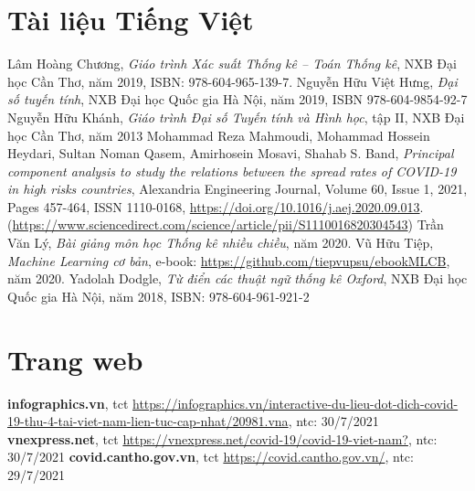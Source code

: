 \documentclass[./thesis.tex]{subfiles}
\begin{document}
	\begin{thebibliography}{10}
  
  
  	\section*{Tài liệu Tiếng Việt}
		   Lâm Hoàng Chương, \textit{Giáo trình Xác suất Thống kê -- Toán Thống kê}, NXB Đại học Cần Thơ, năm 2019, ISBN: 978-604-965-139-7.
		 Nguyễn Hữu Việt Hưng, \textit{Đại số tuyến tính}, NXB Đại học Quốc gia Hà Nội, năm 2019, ISBN 978-604-9854-92-7
		 Nguyễn Hữu Khánh, \textit{Giáo trình Đại số Tuyến tính và Hình học}, tập II, NXB Đại học Cần Thơ, năm 2013
		 Mohammad Reza Mahmoudi, Mohammad Hossein Heydari, Sultan Noman Qasem, Amirhosein Mosavi, Shahab S. Band, \textit{Principal component analysis to study the relations between the spread rates of COVID-19 in high risks countries}, Alexandria Engineering Journal, Volume 60, Issue 1, 2021, Pages 457-464, ISSN 1110-0168, \url{https://doi.org/10.1016/j.aej.2020.09.013}. (\url{https://www.sciencedirect.com/science/article/pii/S1110016820304543})
		 Trần Văn Lý, \textit{Bài giảng môn học Thống kê nhiều chiều}, năm 2020.
		 Vũ Hữu Tiệp, \textit{Machine Learning cơ bản}, e-book: \url{https://github.com/tiepvupsu/ebookMLCB}, năm 2020.
		 Yadolah Dodgle, \textit{Từ điển các thuật ngữ thống kê Oxford}, NXB Đại học Quốc gia Hà Nội, năm 2018, ISBN: 978-604-961-921-2
      
		\section*{Trang web}
		   \textbf{infographics.vn}, tct \url{https://infographics.vn/interactive-du-lieu-dot-dich-covid-19-thu-4-tai-viet-nam-lien-tuc-cap-nhat/20981.vna}, ntc: 30/7/2021
		   \textbf{vnexpress.net}, tct \url{https://vnexpress.net/covid-19/covid-19-viet-nam?}, ntc: 30/7/2021
		   \textbf{covid.cantho.gov.vn}, tct \url{https://covid.cantho.gov.vn/}, ntc: 29/7/2021
		
	\end{thebibliography}
	
\end{document}

